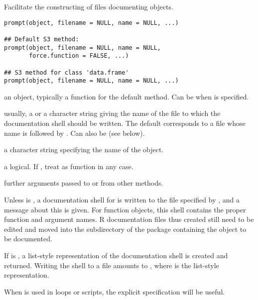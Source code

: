 %
\begin{Description}\relax
Facilitate the constructing of files documenting \R{} objects.
\end{Description}
%
\begin{Usage}
\begin{verbatim}
prompt(object, filename = NULL, name = NULL, ...)

## Default S3 method:
prompt(object, filename = NULL, name = NULL,
       force.function = FALSE, ...)

## S3 method for class 'data.frame'
prompt(object, filename = NULL, name = NULL, ...)
\end{verbatim}
\end{Usage}
%
\begin{Arguments}
\begin{ldescription}
\item[\code{object}] an \R{} object, typically a function for the default
method.  Can be  when  is specified.
\item[\code{filename}] usually, a  or a character string giving the
name of the file to which the documentation shell should be written.
The default corresponds to a file whose name is  followed
by .  Can also be  (see below).
\item[\code{name}] a character string specifying the name of the object.
\item[\code{force.function}] a logical.  If , treat 
as function in any case.
\item[\code{...}] further arguments passed to or from other methods.
\end{ldescription}
\end{Arguments}
%
\begin{Details}\relax
Unless  is , a documentation shell for
 is written to the file specified by , and
a message about this is given.  For function objects, this shell
contains the proper function and argument names.  R documentation
files thus created still need to be edited and moved into the
 subdirectory of the package containing the object to be
documented.

If  is , a list-style representation of the
documentation shell is created and returned.  Writing the shell to a
file amounts to ,
where  is the list-style representation.

When  is used in  loops or scripts, the
explicit  specification will be useful.
\end{Details}
